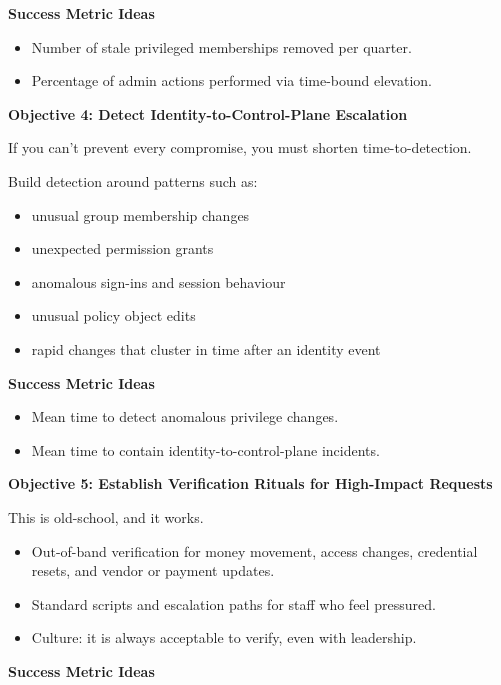 \documentclass[11pt]{article}
\begin{document}
\textbf{Success Metric Ideas}

\begin{itemize}[leftmargin=1.5em]
    \item Number of stale privileged memberships removed per quarter.
    \item Percentage of admin actions performed via time-bound elevation.
\end{itemize}

\textbf{Objective 4: Detect Identity-to-Control-Plane Escalation}

If you can’t prevent every compromise, you must shorten time-to-detection.

Build detection around patterns such as:

\begin{itemize}[leftmargin=1.5em]
    \item unusual group membership changes
    \item unexpected permission grants
    \item anomalous sign-ins and session behaviour
    \item unusual policy object edits
    \item rapid changes that cluster in time after an identity event
\end{itemize}

\textbf{Success Metric Ideas}

\begin{itemize}[leftmargin=1.5em]
    \item Mean time to detect anomalous privilege changes.
    \item Mean time to contain identity-to-control-plane incidents.
\end{itemize}

\textbf{Objective 5: Establish Verification Rituals for High-Impact Requests}

This is old-school, and it works.

\begin{itemize}[leftmargin=1.5em]
    \item Out-of-band verification for money movement, access changes, credential resets, and vendor or payment updates.
    \item Standard scripts and escalation paths for staff who feel pressured.
    \item Culture: it is always acceptable to verify, even with leadership.
\end{itemize}

\textbf{Success Metric Ideas}
\end{document}

